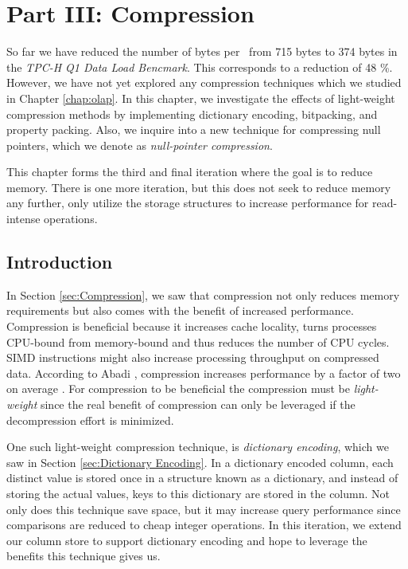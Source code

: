 \chapter{Part III: Compression}
\label{chap:compression}
So far we have reduced the number of bytes per \lineitem~from 715 bytes to 374 bytes in the \textit{TPC-H Q1 Data Load Bencmark}. This corresponds to a reduction of 48 \%. However, we have not yet explored any compression techniques which we studied in Chapter \ref{chap:olap}. In this chapter, we investigate the effects of light-weight compression methods by implementing dictionary encoding, bitpacking, and property packing. Also, we inquire into a new technique for compressing null pointers, which we denote as \textit{null-pointer compression}. 

This chapter forms the third and final iteration where the goal is to reduce memory. There is one more iteration, but this does not seek to reduce memory any further, only utilize the storage structures to increase performance for read-intense operations.

\clearpage

\section{Introduction}
\label{sec:Introduction}
In Section \ref{sec:Compression}, we saw that compression not only reduces memory requirements but also comes with the benefit of increased performance. Compression is beneficial because it increases cache locality, turns processes CPU-bound from memory-bound and thus reduces the number of CPU cycles. SIMD instructions might also increase processing throughput on compressed data. According to Abadi \ea, compression increases performance by a factor of two on average \cite{Abadi2008-dd}. For compression to be beneficial the compression must be \textit{light-weight} since the real benefit of compression can only be leveraged if the decompression effort is minimized.

One such light-weight compression technique, is \textit{dictionary encoding}, which we saw in Section \ref{sec:Dictionary Encoding}. In a dictionary encoded column, each distinct value is stored once in a structure known as a dictionary, and instead of storing the actual values, keys to this dictionary are stored in the column. Not only does this technique save space, but it may increase query performance since comparisons are reduced to cheap integer operations. In this iteration, we extend our column store to support dictionary encoding and hope to leverage the benefits this technique gives us.

